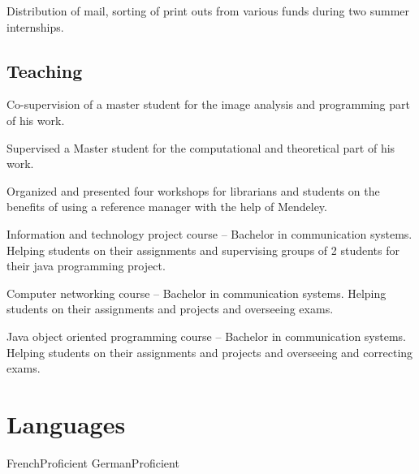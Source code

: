 \documentclass[11pt,a4paper,nolmodern, sans]{moderncv}        %
\begin{document}
{Distribution of mail, sorting of print outs from various funds during two summer internships.}


\subsection{Teaching}

{Co-supervision of a master student for the image analysis and programming part of his work.
}

{Supervised a Master student for the computational and theoretical part of his work. }

{Organized and presented four workshops for librarians and students on the benefits of using a reference manager with the help of Mendeley.
}

{Information and technology project course -- Bachelor in communication systems. Helping students on their assignments and supervising groups of 2 students for their java programming project.}

{Computer networking course -- Bachelor in communication systems. Helping students on their assignments and projects and overseeing exams.}

{Java object oriented programming course -- Bachelor in communication systems. Helping students on their assignments and projects and overseeing and correcting exams.}{}


\section{Languages}
  {French}{Proficient}
    {German}{Proficient}
\end{document}
